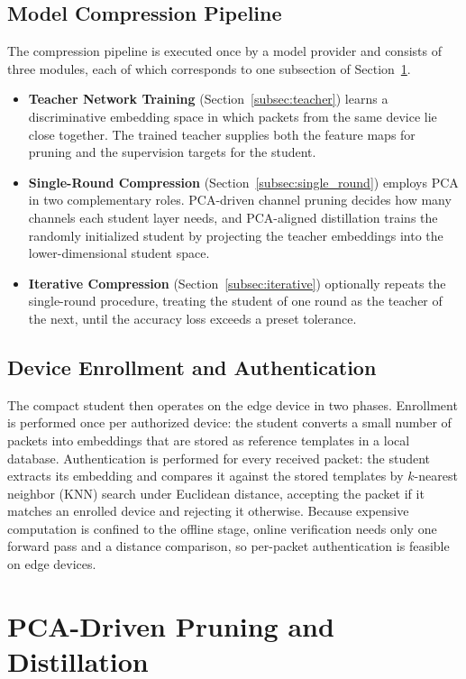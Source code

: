 \documentclass[journal,comsoc]{IEEEtran}
\begin{document}
\subsection{Model Compression Pipeline}

The compression pipeline is executed once by a model provider and consists of three modules, each of which corresponds to one subsection of Section~\ref{sec:design}.
\begin{itemize}
    \item \textbf{Teacher Network Training} (Section~\ref{subsec:teacher}) learns a discriminative embedding space in which packets from the same device lie close together.
    The trained teacher supplies both the feature maps for pruning and the supervision targets for the student.
    \item \textbf{Single-Round Compression} (Section~\ref{subsec:single_round}) employs PCA in two complementary roles.
    PCA-driven channel pruning decides how many channels each student layer needs, and PCA-aligned distillation trains the randomly initialized student by projecting the teacher embeddings into the lower-dimensional student space.
    \item \textbf{Iterative Compression} (Section~\ref{subsec:iterative}) optionally repeats the single-round procedure, treating the student of one round as the teacher of the next, until the accuracy loss exceeds a preset tolerance.
\end{itemize}

\subsection{Device Enrollment and Authentication}

The compact student then operates on the edge device in two phases.
Enrollment is performed once per authorized device: the student converts a small number of packets into embeddings that are stored as reference templates in a local database.
Authentication is performed for every received packet: the student extracts its embedding and compares it against the stored templates by $k$-nearest neighbor (KNN) search under Euclidean distance, accepting the packet if it matches an enrolled device and rejecting it otherwise.
Because expensive computation is confined to the offline stage, online verification needs only one forward pass and a distance comparison, so per-packet authentication is feasible on edge devices.

\section{PCA-Driven Pruning and Distillation}
\label{sec:design}
\end{document}
